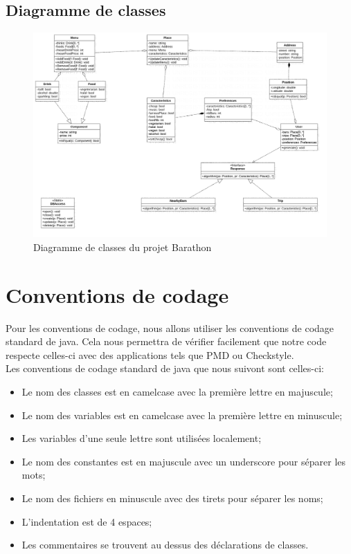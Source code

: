 \documentclass[a4paper,11pt]{article}
\begin{document}
\subsection{Diagramme de classes}

\begin{figure}[H]
    \centering
    \includegraphics[width=\textwidth]{ClassDiagram.png}
    \caption{Diagramme de classes du projet Barathon}
\end{figure}

\section{Conventions de codage}

Pour les conventions de codage, nous allons utiliser les conventions de codage standard de java.
Cela nous permettra de vérifier facilement que notre code respecte celles-ci avec des applications tels que PMD ou Checkstyle.\\
Les conventions de codage standard de java que nous suivont sont celles-ci:

\begin{itemize}
  \item Le nom des classes est en camelcase avec la première lettre en majuscule;
  \item Le nom des variables est en camelcase avec la première lettre en minuscule;
  \item Les variables d'une seule lettre sont utilisées localement;
  \item Le nom des constantes est en majuscule avec un underscore pour séparer les mots;
  \item Le nom des fichiers en minuscule avec des tirets pour séparer les noms;
  \item L'indentation est de 4 espaces;
  \item Les commentaires se trouvent au dessus des déclarations de classes.
\end{itemize}
\end{document}
